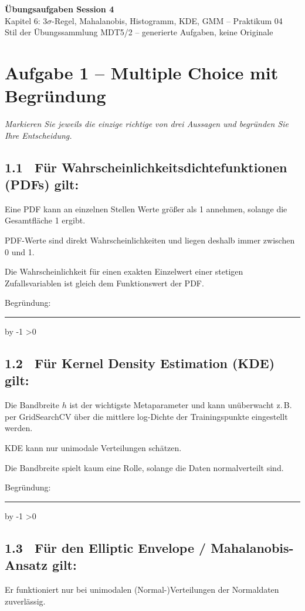 \documentclass[10pt,a4paper]{article}
\newcommand{\mcbox}{\raisebox{-1pt}{\fbox{\rule{0pt}{7pt}\rule{7pt}{0pt}}}\hspace{6pt}}
\newcommand{\antwortlinien}[1]{%
  \par\vspace{2pt}%
  \newcount\zeilen \zeilen=#1
  \loop
    \noindent\rule{\linewidth}{0.4pt}\par\vspace{11pt}%
    \advance\zeilen by -1
  \ifnum\zeilen>0 \repeat
}
\begin{document}
\begin{center}
  {\Large\bfseries Übungsaufgaben Session 4}\\[4pt]
  {\large Kapitel 6: 3$\sigma$-Regel, Mahalanobis, Histogramm, KDE, GMM -- Praktikum 04}\\[4pt]
  \small Stil der Übungssammlung MDT5/2 -- generierte Aufgaben, keine Originale
\end{center}

\vspace{4pt}

\section*{Aufgabe 1 -- Multiple Choice mit Begründung}
\emph{Markieren Sie jeweils die einzige richtige von drei Aussagen und begründen Sie Ihre Entscheidung.}

\subsection*{1.1 \ Für Wahrscheinlichkeitsdichtefunktionen (PDFs) gilt:}
\mcbox Eine PDF kann an einzelnen Stellen Werte größer als 1 annehmen, solange die
Gesamtfläche 1 ergibt.

\mcbox PDF-Werte sind direkt Wahrscheinlichkeiten und liegen deshalb immer zwischen 0 und 1.

\mcbox Die Wahrscheinlichkeit für einen exakten Einzelwert einer stetigen Zufallsvariablen
ist gleich dem Funktionswert der PDF.

Begründung:
\antwortlinien{2}

\subsection*{1.2 \ Für Kernel Density Estimation (KDE) gilt:}
\mcbox Die Bandbreite $h$ ist der wichtigste Metaparameter und kann unüberwacht z.\,B.
per GridSearchCV über die mittlere log-Dichte der Trainingspunkte eingestellt werden.

\mcbox KDE kann nur unimodale Verteilungen schätzen.

\mcbox Die Bandbreite spielt kaum eine Rolle, solange die Daten normalverteilt sind.

Begründung:
\antwortlinien{2}

\subsection*{1.3 \ Für den Elliptic Envelope / Mahalanobis-Ansatz gilt:}
\mcbox Er funktioniert nur bei unimodalen (Normal-)Verteilungen der Normaldaten zuverlässig.
\end{document}
